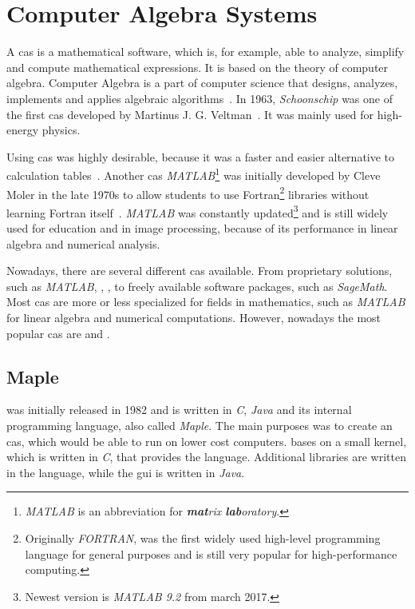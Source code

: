 \section{Computer Algebra Systems}\label{sec:cas}
A \gls{cas} is a mathematical software, which is, for example, able to analyze, simplify and compute mathematical expressions. It is based on the theory of computer algebra. Computer Algebra is a part of computer science that designs, analyzes, implements and applies algebraic algorithms~\cite{ComputerAlgebra}. In 1963, \textit{Schoonschip} was one of the first \gls{cas} developed by Martinus J. G. Veltman~\cite{Schoonschip}. It was mainly used for high-energy physics.

Using \gls{cas} was highly desirable, because it was a faster and easier alternative to calculation tables~\cite{Tables}. Another \gls{cas} \textit{MATLAB}\footnote{\textit{MATLAB} is an abbreviation for \textit{\textbf{mat}rix \textbf{lab}oratory}.} was initially developed by Cleve Moler in the late 1970s to allow students to use Fortran\footnote{Originally \textit{FORTRAN}, was the first widely used high-level programming language for general purposes and is still very popular for high-performance computing.} libraries without learning Fortran itself~\cite{MATLAB}. \textit{MATLAB} was constantly updated\footnote{Newest version is \textit{MATLAB 9.2} from march 2017.} and is still widely used for education and in image processing, because of its performance in linear algebra and numerical analysis.

Nowadays, there are several different \gls{cas} available. From proprietary solutions, such as \textit{MATLAB}, \Maple, \Mathematica, to freely available software packages, such as \textit{SageMath}. Most \gls{cas} are more or less specialized for fields in mathematics, such as \textit{MATLAB} for linear algebra and numerical computations. However, nowadays the most popular \gls{cas} are \Mathematica{} and \Maple.

\subsection{Maple}\label{subsec:maple}
\Maple{} was initially released in 1982 and is written in \textit{C}, \textit{Java} and its internal programming language, also called \textit{Maple}. The main purposes was to create an \gls{cas}, which would be able to run on lower cost computers. \Maple{} bases on a small kernel, which is written in \textit{C}, that provides the \Maple{} language. Additional libraries are written in the \Maple{} language, while the \gls{gui} is written in \textit{Java}.

